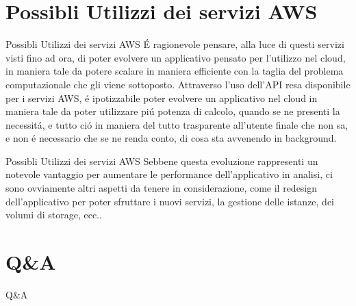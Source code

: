 \documentclass{beamer}
\begin{document}
\section{Possibli Utilizzi dei servizi AWS}
\begin{frame}{Possibli Utilizzi dei servizi AWS}
\'E ragionevole pensare, alla luce di questi servizi visti fino ad ora, di poter evolvere un applicativo pensato per l'utilizzo nel cloud, in maniera tale da potere scalare in maniera
efficiente con la taglia del problema computazionale che gli viene sottoposto. Attraverso l'uso dell'API resa disponibile per i servizi AWS, \'e ipotizzabile poter evolvere un applicativo nel cloud
in maniera tale da poter utilizzare pi\'u potenza di calcolo, quando se ne presenti la necessit\'a, e tutto ci\'o in maniera del tutto trasparente all'utente finale che non sa, e non \'e
necessario che se ne renda conto, di cosa sta avvenendo in background.
\end{frame}


\begin{frame}{Possibli Utilizzi dei servizi AWS}
Sebbene questa evoluzione rappresenti un notevole vantaggio per aumentare le performance dell'applicativo in analisi, ci sono ovviamente altri aspetti da tenere in considerazione, come
il redesign dell'applicativo per poter sfruttare i nuovi servizi, la gestione delle istanze, dei volumi di storage, ecc..
\end{frame}

\section{Q\&A}
\begin{frame}{Q\&A}
\end{frame}
\end{document}
